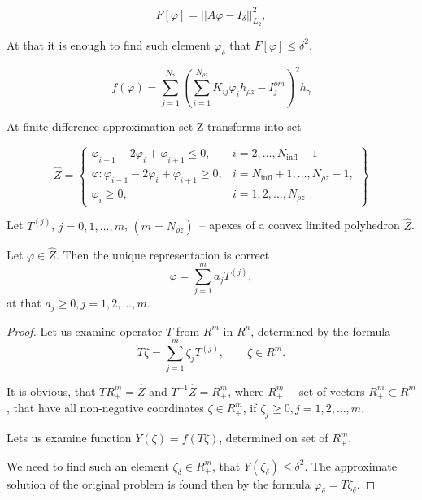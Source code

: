 \documentclass{beamer}
\begin{document}
\begin{frame}[c, allowframebreaks]
    \begin{equation}
        F[\varphi] = || A\varphi - I_\delta||^2_{L_2},
    \end{equation}

    At that it is enough to find such element $\varphi_\delta$ that $F[\varphi] \le \delta^2$.

    \begin{equation}
        f(\varphi) = \sum_{j=1}^{N_\gamma}
        \left( \sum_{i=1}^{N_{\rho z}} K_{ij} \varphi_i h_{\rho z} - I_j^{om} \right)^2 h_\gamma
    \end{equation}

    At finite-difference approximation set Z transforms into set

    \begin{equation}
        \hat{Z} =
        \left\{
            \begin{array}{ll}
                \varphi_{i-1} - 2\varphi_i + \varphi_{i+1} \le 0,
                    & i = 2, \ldots, N_{\text{infl}} - 1         \\
                \varphi: \varphi_{i-1} - 2\varphi_i + \varphi_{i+1} \ge 0,
                    & i = N_{\text{infl}} + 1, \ldots, N_{\rho z} - 1,  \\
                \varphi_i \ge 0, & i = 1,2, \ldots, N_{\rho z}
            \end{array}
        \right\}
    \end{equation}

    \framebreak

    Let $T^{(j)}$, $j = 0, 1, \ldots, m$, $(m = N_{\rho z})$~-- apexes of a convex limited
    polyhedron $\hat{Z}$.

    \begin{Lemma}
        Let $\varphi \in \hat{Z}$. Then the unique representation is correct
        $$ \varphi = \sum_{j=1}^{m} a_j T^{(j)},$$
        at that $a_j \ge 0, j = 1, 2, \ldots, m$.
     \end{Lemma}
     \begin{proof}
        Let us examine operator $T$ from $R^m$ in $R^n$, determined by the formula
        $$ T \zeta = \sum_{j=1}^m \zeta_{j} T^{(j)}, \qquad \zeta \in R^m.$$

        It is obvious, that $TR^m_+ = \hat{Z}$ and $T^{-1}\hat{Z} = R_+^m$,
        where $R_+^m$~-- set of vectors $R_+^m \subset R^m$, that have all non-negative coordinates
        $\zeta \in R_+^m$, if $\zeta_j \ge 0, j = 1,2, \ldots, m$.

        Lets us examine function $Y(\zeta) = f(T\zeta)$, determined on set of $R_+^m$.

        We need to find such an element $\zeta_\delta \in R_+^m$, that
        $Y(\zeta_\delta) \le \delta^2$. The approximate solution of the original problem is found
        then by the formula $\varphi_\delta = T\zeta_\delta$.
        \qedhere
     \end{proof}

\end{frame}
\end{document}

